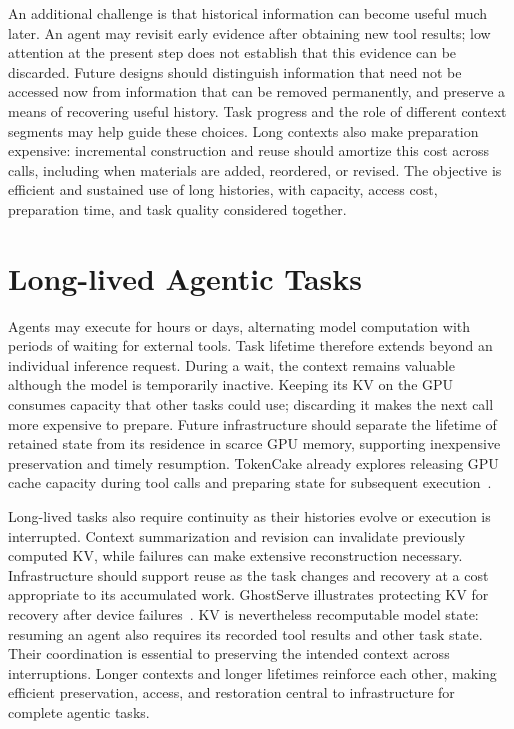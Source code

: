 An additional challenge is that historical information can become useful much later. An agent may revisit early evidence after obtaining new tool results; low attention at the present step does not establish that this evidence can be discarded. Future designs should distinguish information that need not be accessed now from information that can be removed permanently, and preserve a means of recovering useful history. Task progress and the role of different context segments may help guide these choices. Long contexts also make preparation expensive: incremental construction and reuse should amortize this cost across calls, including when materials are added, reordered, or revised. The objective is efficient and sustained use of long histories, with capacity, access cost, preparation time, and task quality considered together.

\section{Long-lived Agentic Tasks}\label{sec:discussion:long-lived}

Agents may execute for hours or days, alternating model computation with periods of waiting for external tools. Task lifetime therefore extends beyond an individual inference request. During a wait, the context remains valuable although the model is temporarily inactive. Keeping its KV on the GPU consumes capacity that other tasks could use; discarding it makes the next call more expensive to prepare. Future infrastructure should separate the lifetime of retained state from its residence in scarce GPU memory, supporting inexpensive preservation and timely resumption. TokenCake already explores releasing GPU cache capacity during tool calls and preparing state for subsequent execution~\cite{kv_bian2025tokencake}.

Long-lived tasks also require continuity as their histories evolve or execution is interrupted. Context summarization and revision can invalidate previously computed KV, while failures can make extensive reconstruction necessary. Infrastructure should support reuse as the task changes and recovery at a cost appropriate to its accumulated work. GhostServe illustrates protecting KV for recovery after device failures~\cite{kv_jayakody2026ghostserve}. KV is nevertheless recomputable model state: resuming an agent also requires its recorded tool results and other task state. Their coordination is essential to preserving the intended context across interruptions. Longer contexts and longer lifetimes reinforce each other, making efficient preservation, access, and restoration central to infrastructure for complete agentic tasks.
